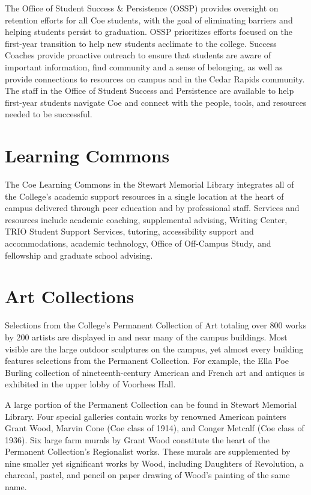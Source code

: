 \documentclass[
  letterpaper,
]{scrbook}
\begin{document}
The Office of Student Success \& Persistence (OSSP) provides oversight
on retention efforts for all Coe students, with the goal of eliminating
barriers and helping students persist to graduation. OSSP prioritizes
efforts focused on the first-year transition to help new students
acclimate to the college. Success Coaches provide proactive outreach to
ensure that students are aware of important information, find community
and a sense of belonging, as well as provide connections to resources on
campus and in the Cedar Rapids community. The staff in the Office of
Student Success and Persistence are available to help first-year
students navigate Coe and connect with the people, tools, and resources
needed to be successful.

\section{Learning Commons}\label{learning-commons}

The Coe Learning Commons in the Stewart Memorial Library integrates all
of the College's academic support resources in a single location at the
heart of campus delivered through peer education and by professional
staff. Services and resources include academic coaching, supplemental
advising, Writing Center, TRIO Student Support Services, tutoring,
accessibility support and accommodations, academic technology, Office of
Off-Campus Study, and fellowship and graduate school advising.

\section{Art Collections}\label{art-collections}

Selections from the College's Permanent Collection of Art totaling over
800 works by 200 artists are displayed in and near many of the campus
buildings. Most visible are the large outdoor sculptures on the campus,
yet almost every building features selections from the Permanent
Collection. For example, the Ella Poe Burling collection of
nineteenth-century American and French art and antiques is exhibited in
the upper lobby of Voorhees Hall.

A large portion of the Permanent Collection can be found in Stewart
Memorial Library. Four special galleries contain works by renowned
American painters Grant Wood, Marvin Cone (Coe class of 1914), and
Conger Metcalf (Coe class of 1936). Six large farm murals by Grant Wood
constitute the heart of the Permanent Collection's Regionalist works.
These murals are supplemented by nine smaller yet significant works by
Wood, including Daughters of Revolution, a charcoal, pastel, and pencil
on paper drawing of Wood's painting of the same name.
\end{document}
